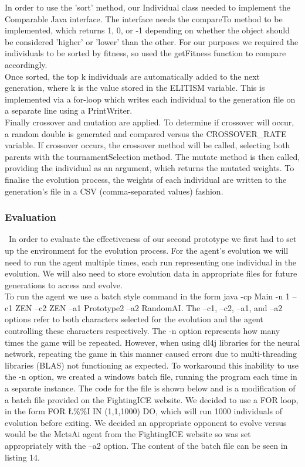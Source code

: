 \documentclass[12pt,a4paper]{article}
\begin{document}
\newpage
In order to use the 'sort' method, our Individual class needed to implement the Comparable Java interface. The interface needs the compareTo method to be implemented, which returns 1, 0, or -1 depending on whether the object should be considered 'higher' or 'lower' than the other. For our purposes we required the individuals to be sorted by fitness, so used the getFitness function to compare accordingly.\\

Once sorted, the top k individuals are automatically added to the next generation, where k is the value stored in the ELITISM variable. This is implemented via a for-loop which writes each individual to the generation file on a separate line using a PrintWriter.\\

Finally crossover and mutation are applied. To determine if crossover will occur, a random double is generated and compared versus the CROSSOVER\_RATE variable. If crossover occurs, the crossover method will be called, selecting both parents with the tournamentSelection method. The mutate method is then called, providing the individual as an argument, which returns the mutated weights. To finalise the evolution process, the weights of each individual are written to the generation's file in a CSV (comma-separated values) fashion.\\

\newpage
\subsubsection{Evaluation}
\
In order to evaluate the effectiveness of our second prototype we first had to set up the environment for the evolution process. For the agent's evolution we will need to run the agent multiple times, each run representing one individual in the evolution. We will also need to store evolution data in appropriate files for future generations to access and evolve.\\

To run the agent we use a batch style command in the form java -cp Main -n 1 --c1 ZEN --c2 ZEN --a1 Prototype2 --a2 RandomAI. The --c1, --c2, --a1, and --a2 options refer to both characters selected for the evolution and the agent controlling these characters respectively. The -n option represents how many times the game will be repeated. However, when using dl4j libraries for the neural network, repeating the game in this manner caused errors due to multi-threading libraries (BLAS) not functioning as expected. To workaround this inability to use the -n option, we created a windows batch file, running the program each time in a separate instance. The code for the file is shown below and is a modification of a batch file provided on the FightingICE website. We decided to use a FOR loop, in the form FOR \L\%\%I IN (1,1,1000) DO, which will run 1000 individuals of evolution before exiting. We decided an appropriate opponent to evolve versus would be the MctsAi agent from the FightingICE website so was set appropriately with the --a2 option. The content of the batch file can be seen in listing 14.\\
\end{document}
